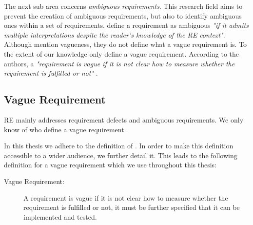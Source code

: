 The next sub area concerns \textit{ambiguous requirements}.
This research field aims to prevent the creation of ambiguous requirements, but also to identify ambiguous ones within a set of requirements.
\Textcite{Kamsties:2000} define a requirement as ambiguous \textit{"if it admits multiple interpretations despite the reader’s knowledge of the RE context"}.
Although \textcite{Kamsties:2000} mention vagueness, they do not define what a vague requirement is.
To the extent of our knowledge only \textcite{Berry:2003} define a vague requirement.
According to the authors, a \textit{"requirement is vague if it is not clear how to measure whether the requirement is fulfilled or not"} \parencite{Berry:2003}.

\subsection{Vague Requirement}
\label{chp:fundamentals:sec:vagueness:subsec:vague_requirement}
\Ac{RE} mainly addresses requirement defects and ambiguous requirements.
We only know of \textcite{Berry:2003} who define a vague requirement.

In this thesis we adhere to the definition of \textcite{Berry:2003}.
In order to make this definition accessible to a wider audience, we further detail it.
This leads to the following definition for a vague requirement which we use throughout this thesis:
\begin{description}
    \item[Vague Requirement:] A requirement is vague if it is not clear how to measure whether the requirement is fulfilled or not, it must be further specified that it can be implemented and tested.
\end{description}

